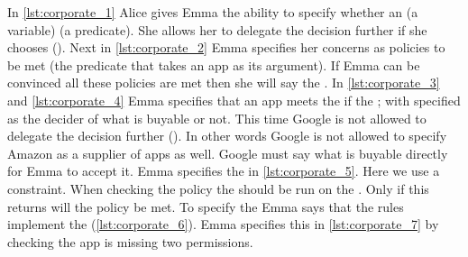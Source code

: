 \documentclass[]{llncs}
\begin{document}
In \autoref{lst:corporate_1} Alice gives Emma the ability to specify whether an  (a variable)  (a predicate).
She allows her to delegate the decision further if she chooses ().
Next in \autoref{lst:corporate_2} Emma specifies her concerns as policies to be met (the  predicate that takes an app as its argument).
If Emma can be convinced all these policies are met then she will say the .
In \autoref{lst:corporate_3} and \autoref{lst:corporate_4} Emma specifies that an app meets the  if the ;
  with  specified as the decider of what is buyable or not.
This time Google is not allowed to delegate the decision further ().
In other words Google is not allowed to specify Amazon as a supplier of apps as well.
Google must say what is buyable directly for Emma to accept it.
Emma specifies the  in \autoref{lst:corporate_5}.
Here we use a constraint.
When checking the policy the  should be run on the .
Only if this returns  will the policy be met.
To specify the  Emma says that the  rules implement the  (\autoref{lst:corporate_6}).
Emma specifies this in \autoref{lst:corporate_7} by checking the app is missing two permissions.
\end{document}
